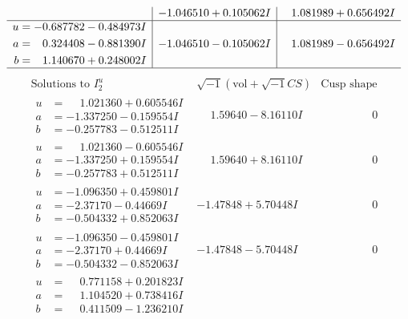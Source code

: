 \documentclass[1p]{elsarticle_modified}
\theoremstyle{definition}
\newcommand{\I}{\sqrt{-1}}
\begin{document}
$$\begin{array}{c|c|c}
 & -1.046510 + 0.105062 I & \phantom{-}1.081989 + 0.656492 I \\ \hline\begin{aligned}
u &= -0.687782 - 0.484973 I \\
a &= \phantom{-}0.324408 - 0.881390 I \\
b &= \phantom{-}1.140670 + 0.248002 I\end{aligned}
 & -1.046510 - 0.105062 I & \phantom{-}1.081989 - 0.656492 I\\
 \hline 
 \end{array}$$\newpage$$\begin{array}{c|c|c}  
\text{Solutions to }I^u_{2}& \I (\text{vol} + \sqrt{-1}CS) & \text{Cusp shape}\\
 \hline 
\begin{aligned}
u &= \phantom{-}1.021360 + 0.605546 I \\
a &= -1.337250 - 0.159554 I \\
b &= -0.257783 - 0.512511 I\end{aligned}
 & \phantom{-}1.59640 - 8.16110 I & \phantom{-0.000000 } 0 \\ \hline\begin{aligned}
u &= \phantom{-}1.021360 - 0.605546 I \\
a &= -1.337250 + 0.159554 I \\
b &= -0.257783 + 0.512511 I\end{aligned}
 & \phantom{-}1.59640 + 8.16110 I & \phantom{-0.000000 } 0 \\ \hline\begin{aligned}
u &= -1.096350 + 0.459801 I \\
a &= -2.37170 - 0.44669 I \\
b &= -0.504332 + 0.852063 I\end{aligned}
 & -1.47848 + 5.70448 I & \phantom{-0.000000 } 0 \\ \hline\begin{aligned}
u &= -1.096350 - 0.459801 I \\
a &= -2.37170 + 0.44669 I \\
b &= -0.504332 - 0.852063 I\end{aligned}
 & -1.47848 - 5.70448 I & \phantom{-0.000000 } 0 \\ \hline\begin{aligned}
u &= \phantom{-}0.771158 + 0.201823 I \\
a &= \phantom{-}1.104520 + 0.738416 I \\
b &= \phantom{-}0.411509 - 1.236210 I\end{aligned}

\end{array}$$
\end{document}

